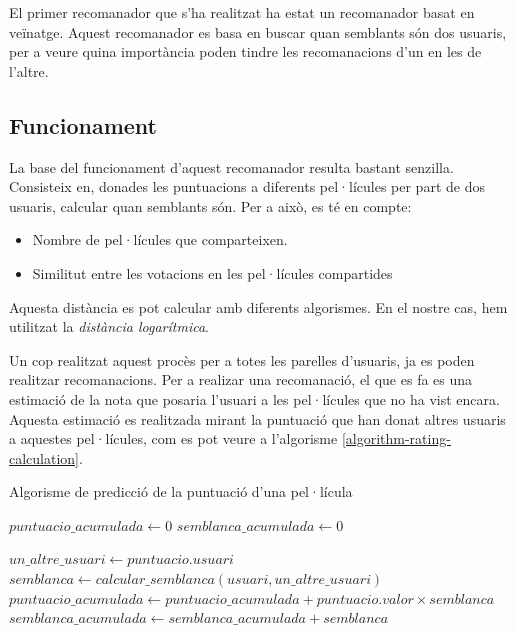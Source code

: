 El primer recomanador que s'ha realitzat ha estat un recomanador basat en veïnatge. Aquest recomanador es basa en buscar quan semblants són dos usuaris, per a veure quina importància poden tindre les recomanacions d'un en les de l'altre.

\subsection{Funcionament}

La base del funcionament d'aquest recomanador resulta bastant senzilla. Consisteix en, donades les puntuacions a diferents pel·lícules per part de dos usuaris, calcular quan semblants són. Per a això, es té en compte:

\begin{itemize}
	\item Nombre de pel·lícules que comparteixen.
	\item Similitut entre les votacions en les pel·lícules compartides
\end{itemize}

Aquesta distància es pot calcular amb diferents algorismes. En el nostre cas, hem utilitzat la \emph{distància logarítmica}.

Un cop realitzat aquest procès per a totes les parelles d'usuaris, ja es poden realitzar recomanacions. Per a realizar una recomanació, el que es fa es una estimació de la nota que posaria l'usuari a les pel·lícules que no ha vist encara. Aquesta estimació es realitzada mirant la puntuació que han donat altres usuaris a aquestes pel·lícules, com es pot veure a l'algorisme \ref{algorithm-rating-calculation}.

\begin{algorithm}
\caption{Algorisme de predicció de la puntuació d'una pel·lícula}
\label{algorithm-rating-calculation}
\begin{algorithmic}
\State $puntuacio\_acumulada \gets 0$
\State $semblanca\_acumulada \gets 0$

	\State $un\_altre\_usuari \gets puntuacio.usuari$
	\State $semblanca \gets calcular\_semblanca(usuari, un\_altre\_usuari)$
	\State $puntuacio\_acumulada \gets puntuacio\_acumulada + puntuacio.valor \times semblanca$
	\State $semblanca\_acumulada \gets semblanca\_acumulada + semblanca$
\EndFor

\end{algorithmic}
\end{algorithm}

